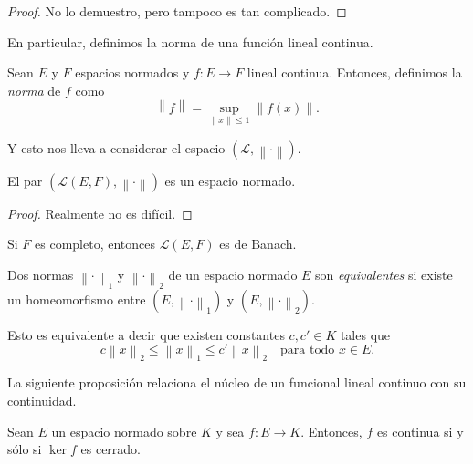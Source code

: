 \begin{proof}
	No lo demuestro, pero tampoco es tan complicado.
\end{proof}

En particular, definimos la norma de una función lineal continua.

\begin{definition}
	Sean $E$ y $F$ espacios normados y $f : E \to F$ lineal continua. Entonces, definimos la \emph{norma} de $f$ como
	\begin{equation*}
		\left\lVert f \right\rVert = \sup_{\left\lVert x \right\rVert \leq 1} \left\lVert f(x) \right\rVert.
	\end{equation*}
\end{definition}

Y esto nos lleva a considerar el espacio $(\mathcal{L}, \left\lVert \cdot \right\rVert)$.

\begin{proposition}
	El par $(\mathcal{L}(E, F), \left\lVert \cdot \right\rVert)$ es un espacio normado.
\end{proposition}

\begin{proof}
	Realmente no es difícil.
\end{proof}

\begin{remark}
	Si $F$ es completo, entonces $\mathcal{L}(E, F)$ es de Banach.
\end{remark}

\begin{definition}
	Dos normas $\left\lVert \cdot \right\rVert_1$ y $\left\lVert \cdot \right\rVert_2$ de un espacio normado $E$ son \emph{equivalentes} si existe un homeomorfismo entre $(E, \left\lVert \cdot \right\rVert_1)$ y $(E, \left\lVert \cdot \right\rVert_2)$.
\end{definition}

\begin{remark}
	Esto es equivalente a decir que existen constantes $c, c' \in K$ tales que
	\begin{equation*}
		c \left\lVert x \right\rVert_2 \leq \left\lVert x \right\rVert_1 \leq c' \left\lVert x \right\rVert_2 \quad \text{para todo }x \in E.
	\end{equation*}
\end{remark}

La siguiente proposición relaciona el núcleo de un funcional lineal continuo con su continuidad.

\begin{proposition}
	Sean $E$ un espacio normado sobre $K$ y sea $f : E \to K$. Entonces, $f$ es continua si y sólo si $\ker f$ es cerrado.
\end{proposition}

